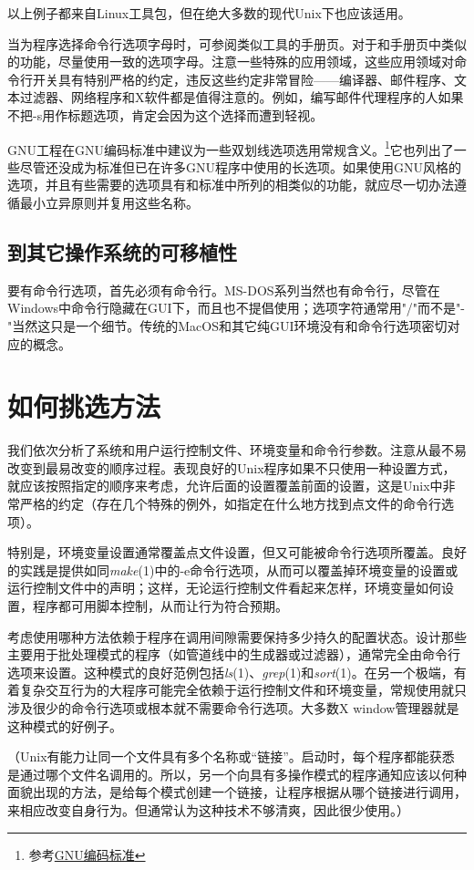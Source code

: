 \documentclass[12pt,oneside]{book}
\begin{document}
以上例子都来自Linux工具包，但在绝大多数的现代Unix下也应该适用。

当为程序选择命令行选项字母时，可参阅类似工具的手册页。对于和手册页中类似的功能，尽量使用一致的选项字母。注意一些特殊的应用领域，这些应用领域对命令行开关具有特别严格的约定，违反这些约定非常冒险——编译器、邮件程序、文本过滤器、网络程序和X软件都是值得注意的。例如，编写邮件代理程序的人如果不把-s用作标题选项，肯定会因为这个选择而遭到轻视。

GNU工程在GNU编码标准中建议为一些双划线选项选用常规含义。\footnote{参考\href{http://www.gnu.org/prep/standards.html}{GNU编码标准}}它也列出了一些尽管还没成为标准但已在许多GNU程序中使用的长选项。如果使用GNU风格的选项，并且有些需要的选项具有和标准中所列的相类似的功能，就应尽一切办法遵循最小立异原则并复用这些名称。

\subsection{到其它操作系统的可移植性}
要有命令行选项，首先必须有命令行。MS-DOS系列当然也有命令行，尽管在Windows中命令行隐藏在GUI下，而且也不提倡使用；选项字符通常用"/"而不是"-"当然这只是一个细节。传统的MacOS和其它纯GUI环境没有和命令行选项密切对应的概念。


\section{如何挑选方法}
我们依次分析了系统和用户运行控制文件、环境变量和命令行参数。注意从最不易改变到最易改变的顺序过程。表现良好的Unix程序如果不只使用一种设置方式，就应该按照指定的顺序来考虑，允许后面的设置覆盖前面的设置，这是Unix中非常严格的约定（存在几个特殊的例外，如指定在什么地方找到点文件的命令行选项）。

特别是，环境变量设置通常覆盖点文件设置，但又可能被命令行选项所覆盖。良好的实践是提供如同\textit{make}(1)中的-e命令行选项，从而可以覆盖掉环境变量的设置或运行控制文件中的声明；这样，无论运行控制文件看起来怎样，环境变量如何设置，程序都可用脚本控制，从而让行为符合预期。

考虑使用哪种方法依赖于程序在调用间隙需要保持多少持久的配置状态。设计那些主要用于批处理模式的程序（如管道线中的生成器或过滤器），通常完全由命令行选项来设置。这种模式的良好范例包括\textit{ls}(1)、\textit{grep}(1)和\textit{sort}(1)。在另一个极端，有着复杂交互行为的大程序可能完全依赖于运行控制文件和环境变量，常规使用就只涉及很少的命令行选项或根本就不需要命令行选项。大多数X window管理器就是这种模式的好例子。

（Unix有能力让同一个文件具有多个名称或“链接”。启动时，每个程序都能获悉是通过哪个文件名调用的。所以，另一个向具有多操作模式的程序通知应该以何种面貌出现的方法，是给每个模式创建一个链接，让程序根据从哪个链接进行调用，来相应改变自身行为。但通常认为这种技术不够清爽，因此很少使用。）
\end{document}
